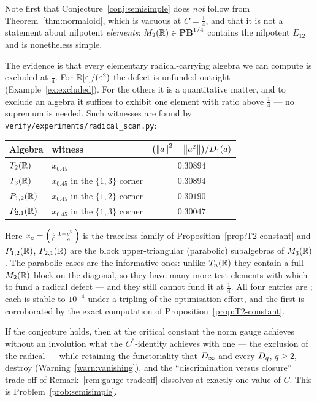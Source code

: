 \begin{remark}[Evidence]\label{rem:semisimple-evidence}
Note first that Conjecture~\ref{conj:semisimple} does \emph{not} follow from
Theorem~\ref{thm:normaloid}, which is vacuous at $C=\tfrac14$, and that it is
not a statement about nilpotent \emph{elements}: $M_2(\mathbb{R})\in\mathbf{PB}^{1/4}$ contains
the nilpotent $E_{12}$ and is nonetheless simple.

The evidence is that every elementary radical-carrying algebra we can compute is
excluded at $\tfrac14$.  For $\mathbb{R}[\varepsilon]/(\varepsilon^2)$ the defect is
unfunded outright (Example~\ref{ex:excluded}).  For the others it is a
quantitative matter, and to exclude an algebra it suffices to exhibit one
element with ratio above $\tfrac14$ --- no supremum is needed.  Such witnesses
are found by \texttt{verify/experiments/radical\_scan.py}:
\begin{center}
\begin{tabular}{llc}
\toprule
Algebra & witness & $\bigl(\left\lVert a\right\rVert^2-\left\lVert a^2\right\rVert\bigr)/D_1(a)$ \\
\midrule
$T_2(\mathbb{R})$   & $x_{0.45}$ & $0.30894$ \\
$T_3(\mathbb{R})$   & $x_{0.45}$ in the $\{1,3\}$ corner & $0.30894$ \\
$P_{1,2}(\mathbb{R})$ & $x_{0.45}$ in the $\{1,2\}$ corner & $0.30190$ \\
$P_{2,1}(\mathbb{R})$ & $x_{0.45}$ in the $\{1,3\}$ corner & $0.30047$ \\
\bottomrule
\end{tabular}
\end{center}
Here $x_c=\begin{psmallmatrix}c&1-c^2\\0&-c\end{psmallmatrix}$ is the traceless
family of Proposition~\ref{prop:T2-constant} and $P_{1,2}(\mathbb{R})$, $P_{2,1}(\mathbb{R})$
are the block upper-triangular (parabolic) subalgebras of $M_3(\mathbb{R})$.  The
parabolic cases are the informative ones: unlike $T_n(\mathbb{R})$ they contain a full
$M_2(\mathbb{R})$ block on the diagonal, so they have many more test elements with
which to fund a radical defect --- and they still cannot fund it at $\tfrac14$.
All four entries are \statusnum; each is stable to $10^{-4}$ under a tripling of
the optimisation effort, and the first is corroborated by the exact computation
of Proposition~\ref{prop:T2-constant}.

If the conjecture holds, then at the critical constant the norm gauge achieves
without an involution what the $C^*$-identity achieves with one --- the
exclusion of the radical --- while retaining the functoriality that
$D_\infty$ and every $D_q$, $q\ge2$, destroy
(Warning~\ref{warn:vanishing}), and the ``discrimination versus closure''
trade-off of Remark~\ref{rem:gauge-tradeoff} dissolves at exactly one value of
$C$.  This is Problem~\ref{prob:semisimple}.
\end{remark}

